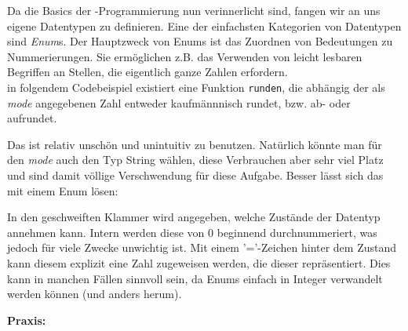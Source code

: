
Da die Basics der \Cpp-Programmierung nun verinnerlicht sind, fangen wir an uns eigene Datentypen zu definieren.
Eine der einfachsten Kategorien von Datentypen sind \emph{Enum}s. Der Hauptzweck von Enums ist das Zuordnen von Bedeutungen zu Nummerierungen.
Sie ermöglichen z.B. das Verwenden von leicht lesbaren Begriffen an Stellen, die eigentlich ganze Zahlen erfordern. \\
in folgendem Codebeispiel existiert eine Funktion \texttt{runden}, die abhängig der als \emph{mode} angegebenen Zahl entweder kaufmännnisch rundet, bzw. ab- oder aufrundet.


Das ist relativ unschön und unintuitiv zu benutzen. Natürlich könnte man für den \emph{mode} auch den Typ String wählen,
diese Verbrauchen aber sehr viel Platz und sind damit völlige Verschwendung für diese Aufgabe.
Besser lässt sich das mit einem Enum lösen:


In den geschweiften Klammer wird angegeben, welche Zustände der Datentyp annehmen kann.
Intern werden diese von 0 beginnend durchnummeriert, was jedoch für viele Zwecke unwichtig ist.
Mit einem '='-Zeichen hinter dem Zustand kann diesem explizit eine Zahl zugeweisen werden, die dieser repräsentiert.
Dies kann in manchen Fällen sinnvoll sein, da Enums einfach in Integer verwandelt werden können (und anders herum).

\textbf{Praxis:}
